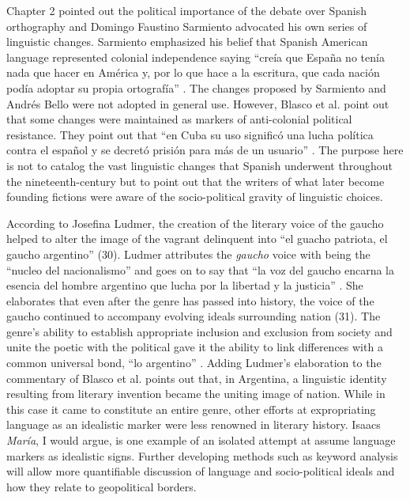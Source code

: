 \documentclass[12pt]{report}
\begin{document}
Chapter 2 pointed out the political importance of the debate over Spanish orthography and Domingo Faustino Sarmiento advocated his own series of linguistic changes.
Sarmiento emphasized his belief that Spanish American language represented colonial independence saying \enquote{creía que España no tenía nada que hacer en América y, por lo que hace a la escritura, que cada nación podía adoptar su propia ortografía} \autocite[58]{Blasco1991}.
The changes proposed by Sarmiento and Andrés Bello were not adopted in general use.
However, Blasco et al. point out that some changes were maintained as markers of anti-colonial political resistance.
They point out that \enquote{en Cuba su uso significó una lucha política contra el español y se decretó prisión para más de un usuario} \autocite[60]{Blasco1991}.
The purpose here is not to catalog the vast linguistic changes that Spanish underwent throughout the nineteenth-century but to point out that the writers of what later become founding fictions were aware of the socio-political gravity of linguistic choices.

According to Josefina Ludmer, the creation of the literary voice of the gaucho helped to alter the image of the vagrant delinquent into \enquote{el guacho patriota, el gaucho argentino} (30).
Ludmer attributes the \textit{gaucho} voice with being the \enquote{nucleo del nacionalismo} and goes on to say that \enquote{la voz del gaucho encarna la esencia del hombre argentino que lucha por la libertad y la justicia} \autocite[33]{Ludmer1991}.
She elaborates that even after the genre has passed into history, the voice of the gaucho continued to accompany evolving ideals surrounding nation (31).
The genre's ability to establish appropriate inclusion and exclusion from society and unite the poetic with the political gave it the ability to link differences with a common universal bond, \enquote{lo argentino} \autocite[33]{Ludmer1991}.
Adding Ludmer's elaboration to the commentary of Blasco et al. points out that, in Argentina, a linguistic identity resulting from literary invention became the uniting image of nation.
While in this case it came to constitute an entire genre, other efforts at expropriating language as an idealistic marker were less renowned in literary history.
Isaacs \textit{María}, I would argue, is one example of an isolated attempt at assume language markers as idealistic signs.
Further developing methods such as keyword analysis will allow more quantifiable discussion of language and socio-political ideals and how they relate to geopolitical borders.
\end{document}

